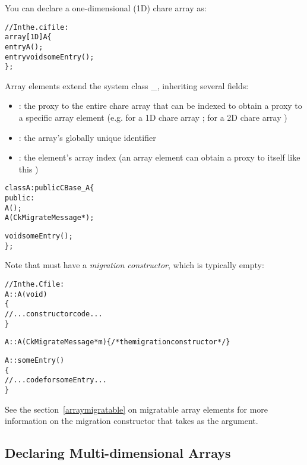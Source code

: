 You can declare a one-dimensional (1D) chare
array as:
%
\begin{alltt}
//In the .ci file:
array [1D] A \{
  entry A();
  entry void someEntry();
\};
\end{alltt}
%
Array elements extend the system class \_, inheriting
several fields:
%
\begin{itemize}
\item {}: the proxy to the entire chare array that can be indexed
  to obtain a proxy to a specific array element (e.g. for a 1D chare array
  ; for a 2D chare array )
\item {}: the array's globally unique identifier
\item {}: the element's array index (an array element can obtain a
  proxy to itself like this )
\end{itemize}
%
%
\begin{alltt}
class A : public CBase\_A \{
  public:
    A();
    A(CkMigrateMessage *);

    void someEntry();
\};
\end{alltt}
%
Note that  must have a \emph{migration constructor}, which is typically
empty:
%
\begin{alltt}
//In the .C file:
A::A(void)
\{
  //... constructor code ...
\}

A::A(CkMigrateMessage *m) \{ /* the migration constructor */ \}

A::someEntry()
\{
  // ... code for someEntry ...
\}
\end{alltt}
%
See the section~\ref{arraymigratable} on migratable array elements for more
information on the migration constructor that takes  as
the argument.

\subsection{Declaring Multi-dimensional Arrays}

